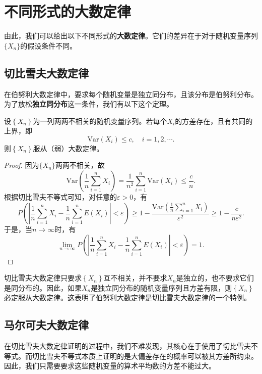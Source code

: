\section{不同形式的大数定律}
由此，我们可以给出以下不同形式的\textbf{大数定律}。它们的差异在于对于随机变量序列$\{X_n\}$的假设条件不同。
\subsection{切比雪夫大数定律}

在伯努利大数定律中，要求每个随机变量是独立同分布，且该分布是伯努利分布。为了放松\textbf{独立同分布}这一条件，我们有以下这个定理。
\begin{theorem}[切比雪夫大数定律]
设$\left \{ X_{n} \right \} $为一列两两不相关的随机变量序列。若每个$X_{i}$的方差存在，且有共同的上界，即$$\text{Var}(X_{i})\leq c, \quad  
 i=1,2,\cdots.$$
 则$\left \{ X_{n} \right \} $服从（弱）大数定律。
\end{theorem}
\begin{proof}
    因为$\{X_n\}$两两不相关，故
    $$
   \text{Var}\left(\frac{1}{n}\sum_{i=1}^n X_i\right) = \frac{1}{n^2}\sum_{i=1}^n \text{Var}(X_i)  \leq \frac{c}{n}.
    $$
    根据切比雪夫不等式可知，对任意的$\varepsilon > 0$，有
    $$
    P\left(\left| \frac{1}{n}\sum_{i=1}^n X_i - \frac{1}{n} \sum_{i=1}^n E(X_i) \right| < \varepsilon \right)\geq 1-\frac{\text{Var}\left(\frac{1}{n}\sum_{i=1}^n X_i\right)}{\varepsilon^2} \geq 1-\frac{c}{n\varepsilon^2}. 
    $$
    于是，当$n\rightarrow \infty$时，有
    $$
    \lim_{n\rightarrow \infty}  P\left(\left| \frac{1}{n}\sum_{i=1}^n X_i - \frac{1}{n} \sum_{i=1}^n E(X_i) \right| < \varepsilon \right) = 1.
    $$
\end{proof}


\begin{remark}
切比雪夫大数定律只要求$\left \{ X_{n} \right \} $互不相关，并不要求$X_n$是独立的，也不要求它们是同分布的。因此，如果${X_{n}}$是独立同分布的随机变量序列且方差有限，则$\left \{ X_{n} \right \} $必定服从大数定律。这表明了伯努利大数定律是切比雪夫大数定律的一个特例。
\end{remark}

\subsection{马尔可夫大数定律}
在切比雪夫大数定律证明的过程中，我们不难发现，其核心在于使用了切比雪夫不等式。而切比雪夫不等式本质上证明的是大偏差存在的概率可以被其方差所约束。因此，我们只需要要求这些随机变量的算术平均数的方差不能过大。

